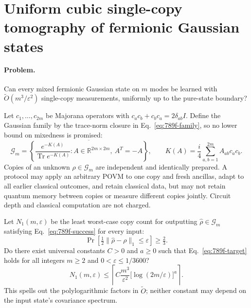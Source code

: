 \section{Uniform cubic single-copy tomography of fermionic Gaussian states}
\label{sec:op_789fc3ddd1f40636}

\paragraph{Problem.}
Can every mixed fermionic Gaussian state on $m$ modes be learned with $\widetilde O(m^3/\varepsilon^2)$ single-copy measurements, uniformly up to the pure-state boundary?

Let $c_1,\ldots,c_{2m}$ be Majorana operators with $c_ac_b+c_bc_a=2\delta_{ab}I$. Define the Gaussian family by the trace-norm closure in Eq.~\eqref{eq:789f-family}, so no lower bound on mixedness is promised:
\begin{equation}
\mathcal G_m=\overline{\left\{\frac{e^{-K(A)}}{\operatorname{Tr}e^{-K(A)}}:A\in\mathbb R^{2m\times2m},\ A^T=-A\right\}},
\qquad K(A)=\frac{i}{4}\sum_{a,b=1}^{2m}A_{ab}c_ac_b.
\label{eq:789f-family}
\end{equation}
Copies of an unknown $\rho\in\mathcal G_m$ are independent and identically prepared. A protocol may apply an arbitrary POVM to one copy and fresh ancillas, adapt to all earlier classical outcomes, and retain classical data, but may not retain quantum memory between copies or measure different copies jointly. Circuit depth and classical computation are not charged.

Let $N_1(m,\varepsilon)$ be the least worst-case copy count for outputting $\widehat\rho\in\mathcal G_m$ satisfying Eq.~\eqref{eq:789f-success} for every input:
\begin{equation}
\Pr\!\left[\tfrac12\|\widehat\rho-\rho\|_1\leq\varepsilon\right]\geq\tfrac23.
\label{eq:789f-success}
\end{equation}
Do there exist universal constants $C>0$ and $a\geq0$ such that Eq.~\eqref{eq:789f-target} holds for all integers $m\geq2$ and $0<\varepsilon\leq1/3600$?
\begin{equation}
N_1(m,\varepsilon)\leq\left\lceil C\frac{m^3}{\varepsilon^2}\bigl[\log(2m/\varepsilon)\bigr]^a\right\rceil.
\label{eq:789f-target}
\end{equation}
This spells out the polylogarithmic factors in $\widetilde O$; neither constant may depend on the input state's covariance spectrum.

